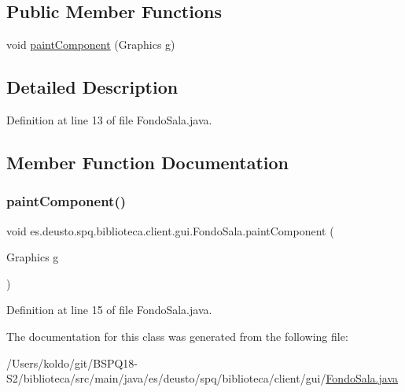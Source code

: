 \subsection*{Public Member Functions}
\begin{DoxyCompactItemize}
\item 
void \mbox{\hyperlink{classes_1_1deusto_1_1spq_1_1biblioteca_1_1client_1_1gui_1_1_fondo_sala_af17076c12afa2d9bdade7b85118aaa56}{paint\+Component}} (Graphics g)
\end{DoxyCompactItemize}


\subsection{Detailed Description}


Definition at line 13 of file Fondo\+Sala.\+java.



\subsection{Member Function Documentation}
\mbox{\label{classes_1_1deusto_1_1spq_1_1biblioteca_1_1client_1_1gui_1_1_fondo_sala_af17076c12afa2d9bdade7b85118aaa56}} 
\subsubsection{\texorpdfstring{paint\+Component()}{paintComponent()}}
{\footnotesize\ttfamily void es.\+deusto.\+spq.\+biblioteca.\+client.\+gui.\+Fondo\+Sala.\+paint\+Component (\begin{DoxyParamCaption}\item[{Graphics}]{g }\end{DoxyParamCaption})}



Definition at line 15 of file Fondo\+Sala.\+java.



The documentation for this class was generated from the following file\+:\begin{DoxyCompactItemize}
\item 
/\+Users/koldo/git/\+B\+S\+P\+Q18-\/\+S2/biblioteca/src/main/java/es/deusto/spq/biblioteca/client/gui/\mbox{\hyperlink{_fondo_sala_8java}{Fondo\+Sala.\+java}}\end{DoxyCompactItemize}
